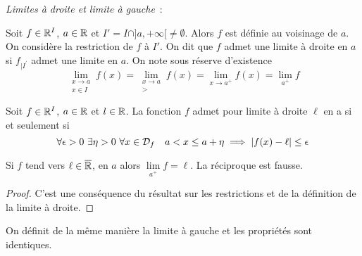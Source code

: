 \emph{Limites à droite et limite à gauche}~:

Soit $f \in \mathbb{R}^I$, $a\in \mathbb{R}$ et $I'=I \cap ]a, +\infty[ \neq \emptyset$. Alors $f$ est définie au voisinage de $a$. On considère la restriction de $f$ à $I'$. On dit que $f$ admet une limite à droite en $a$ si $f_{|I^{'}}$ admet une limite en $a$. On note sous réserve d'existence
\begin{equation}
  \lim\limits_{\begin{array}{l} x \to a \\ x \in I\end{array}}f(x)=\lim\limits_{\begin{array}{c} x \to a \\ >\end{array}}f(x)=\lim\limits_{x \to a^{+}}f(x)=\lim\limits_{a^{+}}f
\end{equation}
\begin{defdef}
  Soit $f \in \mathbb{R}^I$, $a\in \mathbb{R}$ et $l \in \mathbb{R}$. La fonction $f$ admet pour limite à droite $\ell$ en a si et seulement si
  \begin{equation}
    \forall \epsilon > 0 \ \exists \eta > 0 \ \forall x \in \mathcal{D}_{f} \quad a<x\leq a+\eta \implies \left\lvert f(x)-\ell\right\rvert \leq \epsilon
  \end{equation}
\end{defdef}

\begin{prop}
  Si $f$ tend vers $\ell \in \overline{\mathbb{R}}$, en $a$ alors $\lim\limits_{a^{+}}f=\ell$. La réciproque est fausse.
\end{prop}
\begin{proof}
  C'est une conséquence du résultat sur les restrictions et de la définition de la limite à droite.
\end{proof}

On définit de la même manière la limite à gauche et les propriétés sont identiques.

